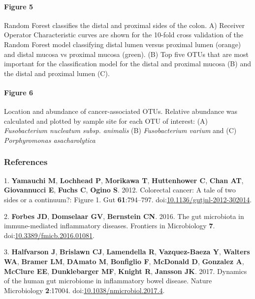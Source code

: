 \documentclass[11pt,]{article}
\let\oldparagraph\paragraph
\renewcommand{\paragraph}[1]{\oldparagraph{#1}\mbox{}}
\begin{document}
\newpage

\paragraph{Figure 5}\label{figure-5}

Random Forest classifies the distal and proximal sides of the colon. A)
Receiver Operator Characteristic curves are shown for the 10-fold cross
validation of the Random Forest model classifying distal lumen versus
proximal lumen (orange) and distal mucosa vs proximal mucosa (green).
(B) Top five OTUs that are most important for the classification model
for the distal and proximal mucosa (B) and the distal and proximal lumen
(C).

\newpage

\paragraph{Figure 6}\label{figure-6}

Location and abundance of cancer-associated OTUs. Relative abundance was
calculated and plotted by sample site for each OTU of interest: (A)
\emph{Fusobacterium nucleatum subsp. animalis} (B) \emph{Fusobacterium
varium} and (C) \emph{Porphyromonas asacharolytica}

\subsubsection*{References}\label{references}

\hypertarget{refs}{}
\hypertarget{ref-Yamauchi2012}{}
1. \textbf{Yamauchi M}, \textbf{Lochhead P}, \textbf{Morikawa T},
\textbf{Huttenhower C}, \textbf{Chan AT}, \textbf{Giovannucci E},
\textbf{Fuchs C}, \textbf{Ogino S}. 2012. Colorectal cancer: A tale of
two sides or a continuum?: Figure 1. Gut \textbf{61}:794--797.
doi:\href{https://doi.org/10.1136/gutjnl-2012-302014}{10.1136/gutjnl-2012-302014}.

\hypertarget{ref-Forbes2016}{}
2. \textbf{Forbes JD}, \textbf{Domselaar GV}, \textbf{Bernstein CN}.
2016. The gut microbiota in immune-mediated inflammatory diseases.
Frontiers in Microbiology \textbf{7}.
doi:\href{https://doi.org/10.3389/fmicb.2016.01081}{10.3389/fmicb.2016.01081}.

\hypertarget{ref-Halfvarson2017}{}
3. \textbf{Halfvarson J}, \textbf{Brislawn CJ}, \textbf{Lamendella R},
\textbf{Vazquez-Baeza Y}, \textbf{Walters WA}, \textbf{Bramer LM},
\textbf{DAmato M}, \textbf{Bonfiglio F}, \textbf{McDonald D},
\textbf{Gonzalez A}, \textbf{McClure EE}, \textbf{Dunklebarger MF},
\textbf{Knight R}, \textbf{Jansson JK}. 2017. Dynamics of the human gut
microbiome in inflammatory bowel disease. Nature Microbiology
\textbf{2}:17004.
doi:\href{https://doi.org/10.1038/nmicrobiol.2017.4}{10.1038/nmicrobiol.2017.4}.
\end{document}
